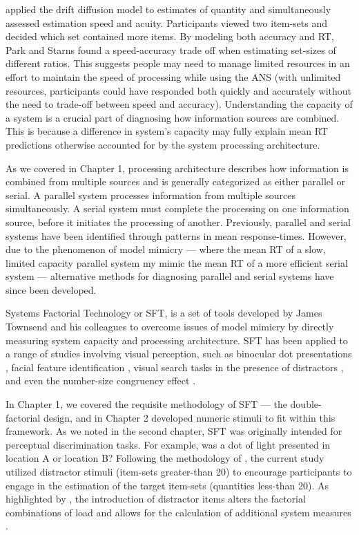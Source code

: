  applied the drift diffusion model \cite{ratcliff1978Diffusion} to estimates of quantity and simultaneously assessed estimation speed and acuity. Participants viewed two item-sets and decided which set contained more items. By modeling both accuracy and RT, Park and Starns found a speed-accuracy trade off when estimating set-sizes of different ratios. This suggests people may need to manage limited resources in an effort to maintain the speed of processing while using the ANS (with unlimited resources, participants could have responded both quickly and accurately without the need to trade-off between speed and accuracy). Understanding the capacity of a system is a crucial part of diagnosing how information sources are combined. This is because a difference in system's capacity may fully explain mean RT predictions otherwise accounted for by the system processing architecture.

As we covered in Chapter 1, processing architecture describes how information is combined from multiple sources and is generally categorized as either parallel or serial. A parallel system processes information from multiple sources simultaneously. A serial system must complete the processing on one information source, before it initiates the processing of another. Previously, parallel and serial systems have been identified through patterns in mean response-times. However, due to the phenomenon of model mimicry \cite{Townsend1971, Townsend1972, TOWNSEND_1983} --- where the mean RT of a slow, limited capacity parallel system my mimic the mean RT of a more efficient serial system --- alternative methods for diagnosing parallel and serial systems have since been developed.

Systems Factorial Technology or SFT, is a set of tools developed by James Townsend and his colleagues to overcome issues of model mimicry by directly measuring system capacity and processing architecture. SFT has been applied to a range of studies involving visual perception, such as binocular dot presentations \cite{Townsend_1995}, facial feature identification \cite{Wenger2001, Wenger2006}, visual search tasks in the presence of distractors \cite{Fific2008}, and even the number-size congruency effect \cite{fitousi2018system}. 

In Chapter 1, we covered the requisite methodology of SFT --- the double-factorial design, and in Chapter 2 developed numeric stimuli to fit within this framework. As we noted in the second chapter, SFT was originally intended for perceptual discrimination tasks. For example, was a dot of light presented in location A or location B? Following the methodology of , the current study utilized distractor stimuli (item-sets greater-than 20) to encourage participants to engage in the estimation of the target item-sets (quantities less-than 20). As highlighted by , the introduction of distractor items alters the factorial combinations of load and allows for the calculation of additional system measures \cite{little2015resilience, Little2018_CCF}.

